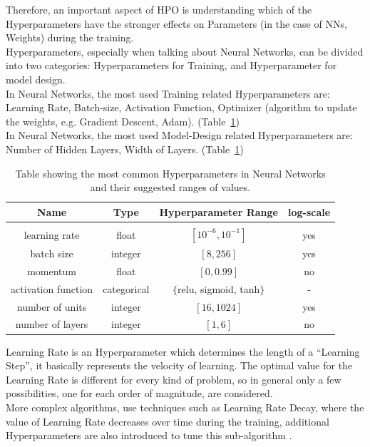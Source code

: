 Therefore, an important aspect of HPO is understanding which of the Hyperparameters have the stronger effects on Parameters (in the case of NNs, Weights) during the training.
\\[0.3cm]Hyperparameters, especially when talking about Neural Networks, can be divided into two categories: Hyperparameters for Training, and Hyperparameter for model design.
\\[0.3cm]In Neural Networks, the most used Training related Hyperparameters are: Learning Rate, Batch-size, Activation Function, Optimizer (algorithm to update the weights, e.g. Gradient Descent, Adam). (Table~\ref{tab:table-2.6.1})
\\[0.3cm]In Neural Networks, the most used Model-Design related Hyperparameters are: Number of Hidden Layers, Width of Layers. (Table~\ref{tab:table-2.6.1})
\begin{table}[ht!]
	\center
	\setlength{\tabcolsep}{0.5cm}
	\caption[Common Hyperparameters in Neural Networks]{Table showing the most common Hyperparameters in Neural Networks and their suggested ranges of values.}
	\begin{tabular}{c c c c}
	Name & Type & Hyperparameter Range & log-scale\\[0.1cm]
	\hline\\[0.1cm]
	learning rate & float & $[10^{-6}, 10^{-1}]$ & yes\\[0.2cm]
	batch size & integer & $[8, 256]$ & yes\\[0.2cm]
	momentum & float & $[0, 0.99]$ & no\\[0.2cm]
	activation function & categorical & $\{$relu, sigmoid, tanh$\}$ & -\\[0.2cm]
	number of units & integer & $[16, 1024]$ & yes\\[0.2cm]
	number of layers & integer & $[1, 6]$ & no\\[0.2cm]
	\end{tabular}
	\label{tab:table-2.6.1}
\end{table}

Learning Rate is an Hyperparameter which determines the length of a “Learning Step”, it basically represents the velocity of learning.
The optimal value for the Learning Rate is different for every kind of problem, so in general only a few possibilities, one for each order of magnitude, are considered.
\\[0.3cm]More complex algorithms, use techniques such as Learning Rate Decay, where the value of Learning Rate decreases over time during the training, additional Hyperparameters are also introduced to tune this sub-algorithm \cite{Tesi-1.9}.

